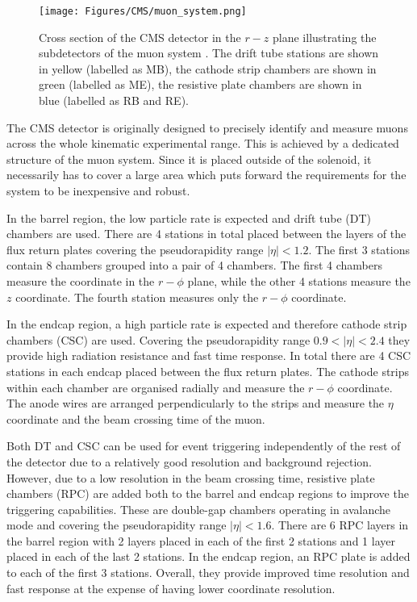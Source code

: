 \begin{figure}[h!]
    \centering
    \texttt{[image: Figures/CMS/muon\_system.png]}
    \caption{Cross section of the CMS detector in the $r-z$ plane illustrating the subdetectors of the muon system \cite{CMS:2018rym}. The drift tube stations are shown in yellow (labelled as MB), the cathode strip chambers are shown in green (labelled as ME), the resistive plate chambers are shown in blue (labelled as RB and RE).}
    \label{fig:muon-system}
\end{figure}

The CMS detector is originally designed to precisely identify and measure muons across the whole kinematic experimental range. This is achieved by a dedicated structure of the muon system. Since it is placed outside of the solenoid, it necessarily has to cover a large area which puts forward the requirements for the system to be inexpensive and robust.

In the barrel region, the low particle rate is expected and drift tube (DT) chambers are used. There are 4 stations in total placed between the layers of the flux return plates covering the pseudorapidity range $|\eta| < 1.2$. The first 3 stations contain 8 chambers grouped into a pair of 4 chambers. The first 4 chambers measure the coordinate in the $r-\phi$ plane, while the other 4 stations measure the $z$ coordinate. The fourth station measures only the $r-\phi$ coordinate.

In the endcap region, a high particle rate is expected and therefore cathode strip chambers (CSC) are used. Covering the pseudorapidity range $0.9 < |\eta| < 2.4$ they provide high radiation resistance and fast time response. In total there are 4 CSC stations in each endcap placed between the flux return plates. The cathode strips within each chamber are organised radially and measure the $r-\phi$ coordinate. The anode wires are arranged perpendicularly to the strips and measure the $\eta$ coordinate and the beam crossing time of the muon.

Both DT and CSC can be used for event triggering independently of the rest of the detector due to a relatively good \pt resolution and background rejection. However, due to a low resolution in the beam crossing time, resistive plate chambers (RPC) are added both to the barrel and endcap regions to improve the triggering capabilities. These are double-gap chambers operating in avalanche mode and covering the pseudorapidity range $|\eta| < 1.6$. There are 6 RPC layers in the barrel region with 2 layers placed in each of the first 2 stations and 1 layer placed in each of the last 2 stations. In the endcap region, an RPC plate is added to each of the first 3 stations. Overall, they provide improved time resolution and fast response at the expense of having lower coordinate resolution.

